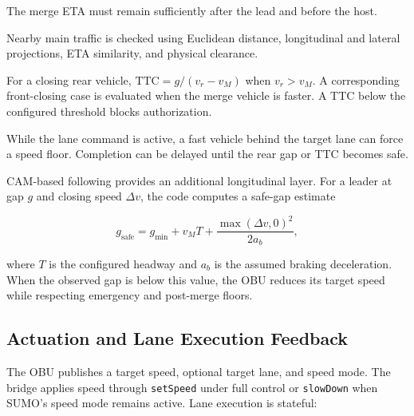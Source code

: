 \documentclass[a4paper,12pt]{article}
\begin{document}
\begin{description}[font=\normalfont\bfseries,leftmargin=0pt,labelindent=0pt,labelsep=0.6em]
    \item[Lead and host temporal gaps.] The merge ETA must remain sufficiently after the lead and before the host.
    \item[Final geometric guard.] Nearby main traffic is checked using Euclidean distance, longitudinal and lateral projections, ETA similarity, and physical clearance.
    \item[Time-to-collision guard.] For a closing rear vehicle, $\mathrm{TTC}=g/(v_r-v_M)$ when $v_r>v_M$. A corresponding front-closing case is evaluated when the merge vehicle is faster. A TTC below the configured threshold blocks authorization.
    \item[Apply and post-clear rear guards.] While the lane command is active, a fast vehicle behind the target lane can force a speed floor. Completion can be delayed until the rear gap or TTC becomes safe.
\end{description}

CAM-based following provides an additional longitudinal layer. For a leader at gap $g$ and closing speed $\Delta v$, the code computes a safe-gap estimate

\begin{equation}
    g_{\mathrm{safe}} = g_{\min} + v_M T + \frac{\max(\Delta v,0)^2}{2a_b},
    \label{eq:safegap}
\end{equation}

where $T$ is the configured headway and $a_b$ is the assumed braking deceleration. When the observed gap is below this value, the OBU reduces its target speed while respecting emergency and post-merge floors.

\subsection{Actuation and Lane Execution Feedback}

The OBU publishes a target speed, optional target lane, and speed mode. The bridge applies speed through \texttt{setSpeed} under full control or \texttt{slowDown} when SUMO's speed mode remains active. Lane execution is stateful:
\end{document}

